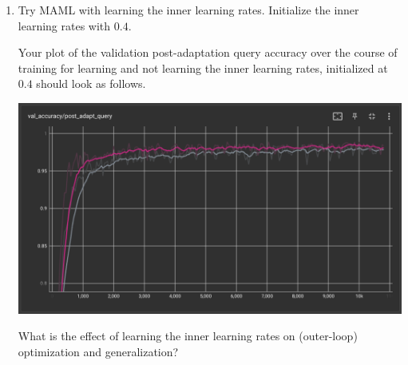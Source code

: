 \begin{enumerate}[label=(\roman*)]
    \item Try MAML with learning the inner learning rates. Initialize the inner learning rates with $0.4$.

    Your plot of the validation post-adaptation query accuracy over the course of training for learning and not learning the inner learning rates, initialized at $0.4$ should look as follows.
    \begin{center}
        \includegraphics[width=0.75\linewidth]{./figures/maml_q5}
    \end{center}

    What is the effect of learning the inner learning rates on (outer-loop) optimization and generalization?
\end{enumerate}